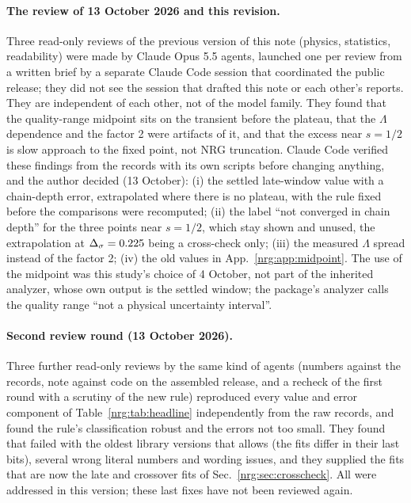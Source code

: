 \paragraph{The review of 13 October 2026 and this revision.} Three read-only reviews of the previous version of this note (physics,
statistics, readability) were made by Claude Opus 5.5 agents, launched one per review from a written brief by a separate Claude Code
session that coordinated the public release; they did not see the session that drafted this note or each other's reports. They are
independent of each other,
not of the model family. They found that the quality-range midpoint sits on the transient before the plateau, that the
$\Lambda$ dependence and the factor 2 were artifacts of it, and that the excess near $s=1/2$ is slow approach to the fixed point, not
NRG truncation. Claude Code verified these findings from the records with its own scripts before changing anything, and the author
decided (13 October): (i) the settled late-window value with a chain-depth error, extrapolated where there is no plateau, with the rule
fixed before the comparisons were recomputed; (ii) the label ``not converged in chain depth'' for the three points near $s=1/2$, which
stay shown and unused, the extrapolation at $\Delta_\sigma=0.225$ being a cross-check only; (iii) the measured $\Lambda$ spread instead of the
factor 2; (iv) the old values in App.~\ref{nrg:app:midpoint}. The use of the midpoint was this study's choice of 4 October, not part of the
inherited analyzer, whose own output is the settled window; the package's analyzer calls the quality range ``not a physical
uncertainty interval''.

\paragraph{Second review round (13 October 2026).} Three further read-only reviews by the same kind of agents (numbers against the
records, note against code on the assembled release, and a recheck of the first round with a scrutiny of the new rule) reproduced
every value and error component of Table~\ref{nrg:tab:headline} independently from the raw records, and found the rule's classification
robust and the errors not too small. They found that  failed with the oldest library versions that
 allows (the fits differ in their last bits), several wrong literal numbers and wording issues, and they
supplied the fits that are now the late and crossover fits of Sec.~\ref{nrg:sec:crosscheck}. All were addressed in this version; these
last fixes have not been reviewed again.

